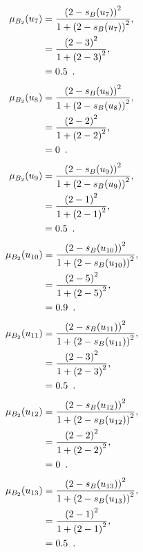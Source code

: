 \documentclass[a4paper,openany]{book}
\begin{document}
				\begin{align}
					\mu_{B_2}(u_7) &= \frac{\left(2-s_B(u_7)\right)^2}{1 + \left(2-s_B(u_7)\right)^2} ,\\
					&= \frac{\left(2-3\right)^2}{1 + \left(2-3\right)^2} \notag ,\\
					&= 0.5 \enspace. \notag
				\end{align}
				\begin{align}
					\mu_{B_2}(u_8) &= \frac{\left(2-s_B(u_8)\right)^2}{1 + \left(2-s_B(u_8)\right)^2} ,\\
					&= \frac{\left(2-2\right)^2}{1 + \left(2-2\right)^2} \notag ,\\
					&= 0 \enspace. \notag
				\end{align}
				\begin{align}
					\mu_{B_2}(u_9) &= \frac{\left(2-s_B(u_9)\right)^2}{1 + \left(2-s_B(u_9)\right)^2} ,\\
					&= \frac{\left(2-1\right)^2}{1 + \left(2-1\right)^2} \notag ,\\
					&= 0.5 \enspace. \notag
				\end{align}
				\begin{align}
					\mu_{B_2}(u_{10}) &= \frac{\left(2-s_B(u_{10})\right)^2}{1 + \left(2-s_B(u_{10})\right)^2} ,\\
					&= \frac{\left(2-5\right)^2}{1 + \left(2-5\right)^2} \notag ,\\
					&= 0.9 \enspace. \notag
				\end{align}
				\begin{align}
					\mu_{B_2}(u_{11}) &= \frac{\left(2-s_B(u_{11})\right)^2}{1 + \left(2-s_B(u_{11})\right)^2} ,\\
					&= \frac{\left(2-3\right)^2}{1 + \left(2-3\right)^2} \notag ,\\
					&= 0.5 \enspace. \notag
				\end{align}
				\begin{align}
					\mu_{B_2}(u_{12}) &= \frac{\left(2-s_B(u_{12})\right)^2}{1 + \left(2-s_B(u_{12})\right)^2} ,\\
					&= \frac{\left(2-2\right)^2}{1 + \left(2-2\right)^2} \notag ,\\
					&= 0 \enspace. \notag
				\end{align}
				\begin{align}
					\mu_{B_2}(u_{13}) &= \frac{\left(2-s_B(u_{13})\right)^2}{1 + \left(2-s_B(u_{13})\right)^2} ,\\
					&= \frac{\left(2-1\right)^2}{1 + \left(2-1\right)^2} \notag ,\\
					&= 0.5 \enspace. \notag
				\end{align}
\end{document}
